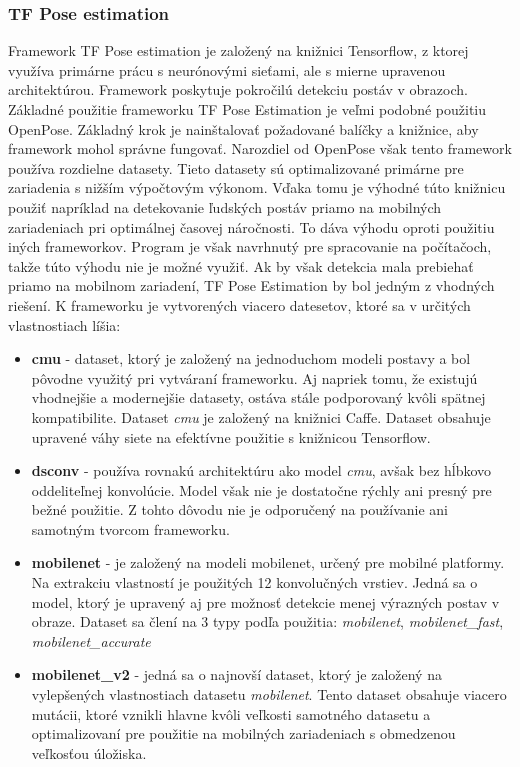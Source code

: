 \documentclass[slovak,master,dept460,male,cpp,cpdeclaration]{diploma}
\begin{document}
\subsubsection*{TF Pose estimation}
\label{sec:tf_pose}
Framework TF Pose estimation je založený na knižnici Tensorflow, z ktorej využíva primárne prácu s neurónovými sieťami, ale s mierne upravenou architektúrou. Framework poskytuje pokročilú detekciu postáv v obrazoch. Základné použitie frameworku TF Pose Estimation je veľmi podobné použitiu OpenPose. Základný krok je nainštalovať požadované balíčky a knižnice, aby framework mohol správne fungovať. Narozdiel od OpenPose však tento framework používa rozdielne datasety. Tieto datasety sú optimalizované primárne pre zariadenia s nižším výpočtovým výkonom. Vďaka tomu je výhodné túto knižnicu použiť napríklad na detekovanie ľudských postáv priamo na mobilných zariadeniach pri optimálnej časovej náročnosti. To dáva výhodu oproti použitiu iných frameworkov. Program je však navrhnutý pre spracovanie na   počítačoch, takže túto výhodu nie je možné využiť. Ak by však detekcia mala prebiehať priamo na mobilnom zariadení, TF Pose Estimation by bol jedným z vhodných riešení. K frameworku je vytvorených viacero datesetov, ktoré sa v určitých vlastnostiach líšia:

 \begin{itemize}
\item \textbf{cmu} - dataset, ktorý je založený na jednoduchom modeli postavy a bol pôvodne využitý pri vytváraní frameworku. Aj napriek tomu, že  existujú vhodnejšie a modernejšie  datasety, ostáva stále podporovaný kvôli spätnej kompatibilite. Dataset \textit{cmu} je založený na knižnici Caffe. Dataset obsahuje upravené váhy siete na efektívne použitie s knižnicou Tensorflow.
\item \textbf{dsconv} - používa rovnakú architektúru ako model \textit{cmu}, avšak bez hĺbkovo oddeliteľnej konvolúcie. Model však nie je dostatočne rýchly ani presný pre bežné použitie. Z tohto dôvodu nie je odporučený na používanie ani samotným tvorcom frameworku.
\item \textbf{mobilenet} - je založený na modeli mobilenet, určený pre mobilné platformy. Na extrakciu  vlastností je použitých 12 konvolučných vrstiev. Jedná sa o model, ktorý je upravený aj pre  možnosť detekcie menej výrazných postav v obraze. Dataset sa člení  na 3 typy podľa použitia: \textit{mobilenet}, \textit{mobilenet\_fast}, \textit{mobilenet\_accurate}
\item \textbf{mobilenet\_v2} - jedná sa o najnovší dataset, ktorý je založený na vylepšených vlastnostiach datasetu \textit{mobilenet}. Tento dataset obsahuje viacero mutácii, ktoré  vznikli hlavne kvôli veľkosti samotného datasetu a optimalizovaní pre použitie na mobilných zariadeniach s obmedzenou veľkosťou úložiska.
\end{itemize}
\end{document}

